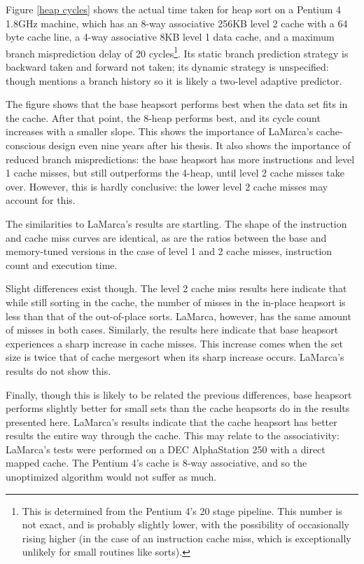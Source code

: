 Figure \ref{heap cycles} shows the actual time taken for heap sort on a Pentium
4 1.8GHz machine, which has an 8-way associative 256KB level 2 cache with a 64 byte
cache line, a 4-way associative 8KB level 1 data cache, and a maximum branch
misprediction delay of 20 cycles\footnote{This is determined from the Pentium
4's 20 stage pipeline. This number is not exact, and is probably slightly lower,
with the possibility of occasionally rising higher (in the case of an
instruction cache miss, which is exceptionally unlikely for small routines like
sorts).}. Its static branch prediction strategy is backward taken and forward
not taken; its dynamic strategy is unspecified: though \cite{Intel248966-010}
mentions a branch history so it is likely a two-level adaptive predictor.

The figure shows that the base heapsort performs best when the data set fits in
the cache. After that point, the 8-heap performs best, and its cycle count increases
with a smaller slope. This shows the importance of LaMarca's cache-conscious
design even nine years after his thesis. It also shows the importance of reduced
branch mispredictions: the base heapsort has more instructions and level 1 cache
misses, but still outperforms the 4-heap, until level 2 cache misses take over.
However, this is hardly conclusive: the lower level 2 cache misses may account
for this.

The similarities to LaMarca's results are startling. The shape of the
instruction and cache miss curves are identical, as are the ratios between the
base and memory-tuned versions in the case of level 1 and 2 cache misses,
instruction count and execution time.

Slight differences exist though. The level 2 cache miss results here indicate
that while still sorting in the cache, the number of misses in the in-place
heapsort is less than that of the out-of-place sorts. LaMarca, however, has the
same amount of misses in both cases. Similarly, the results here indicate that
base heapsort experiences a sharp increase in cache misses. This increase comes
when the set size is twice that of cache mergesort when its sharp increase
occurs. LaMarca's results do not show this.

Finally, though this is likely to be related the previous differences, base
heapsort performs slightly better for small sets than the cache heapsorts do in
the results presented here. LaMarca's results indicate that the cache heapsort
has better results the entire way through the cache. This may relate to the
associativity: LaMarca's tests were performed on a DEC AlphaStation 250 with a
direct mapped cache. The Pentium 4's cache is 8-way associative, and so the
unoptimized algorithm would not suffer as much.

